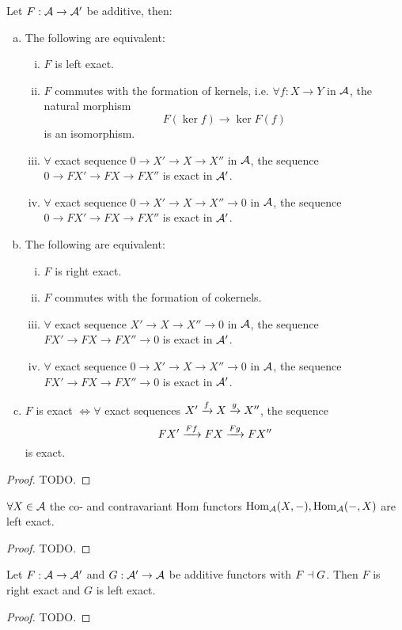 \documentclass[a4paper]{report}
\begin{document}
\begin{prop}
  Let $F: \mathcal{A} \to \mathcal{A}'$ be additive, then:
  \begin{enumerate}[(a)]
    \item The following are equivalent:
          \begin{enumerate}[(i)]
            \item $F$ is left exact.
            \item $F$ commutes with the formation of kernels, i.e. $\forall f: X \to Y$ in $\mathcal{A}$, the natural morphism \[F(\ker f) \to \ker F(f)\]is an isomorphism.
            \item $\forall$ exact sequence $0 \to X' \to X \to X''$ in $\mathcal{A}$, the sequence $0 \to FX' \to FX \to FX''$ is exact in $\mathcal{A}'$.
            \item $\forall$ exact sequence $0 \to X' \to X \to X'' \to 0$ in $\mathcal{A}$, the sequence $0 \to FX' \to FX \to FX''$ is exact in $\mathcal{A}'$.
          \end{enumerate}
    \item The following are equivalent:
          \begin{enumerate}[(i)]
            \item $F$ is right exact.
            \item $F$ commutes with the formation of cokernels.
            \item $\forall$ exact sequence $X' \to X \to X'' \to 0$ in $\mathcal{A}$, the sequence $FX' \to FX \to FX'' \to 0$ is exact in $\mathcal{A}'$.
            \item $\forall$ exact sequence $0 \to X' \to X \to X'' \to 0$ in $\mathcal{A}$, the sequence $FX' \to FX \to FX'' \to 0$ is exact in $\mathcal{A}'$.
          \end{enumerate}
          \item $F$ is exact $\iff \forall$ exact sequences $X' \xrightarrow f X \xrightarrow g X''$, the sequence \[FX' \xrightarrow {Ff} FX \xrightarrow {Fg} FX''\]is exact.
  \end{enumerate}
\begin{proof}
TODO.
\end{proof}
\end{prop}

\begin{prop}
  $\forall X \in \mathcal{A}$ the co- and contravariant Hom functors $\operatorname{Hom}_{\mathcal{A}}(X,-), \operatorname{Hom}_{\mathcal{A}}(-,X)$ are left exact.
  \begin{proof}
TODO.
  \end{proof}
\end{prop}


\begin{prop}
  Let $F: \mathcal{A} \to \mathcal{A}'$ and $G: \mathcal{A}' \to \mathcal{A}$ be additive functors with $F \dashv G$. Then $F$ is right exact and $G$ is left exact.
  \begin{proof}
TODO.
  \end{proof}
\end{prop}
\end{document}
